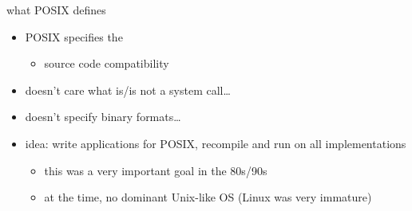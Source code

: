 \begin{frame}{what POSIX defines}
\begin{itemize}
\item POSIX specifies the 
    \begin{itemize}
    \item source code compatibility
    \end{itemize}
\item doesn't care what is/is not a system call\ldots
\item doesn't specify binary formats\ldots
\item idea: write applications for POSIX, recompile and run on all implementations
    \begin{itemize}
    \item this was a very important goal in the 80s/90s
    \item at the time, no dominant Unix-like OS (Linux was very immature)
    \end{itemize}
\end{itemize}
\end{frame}
